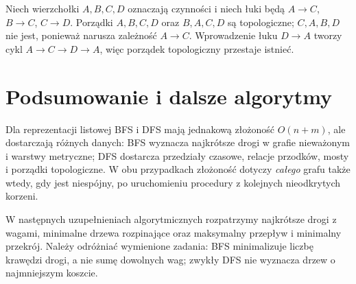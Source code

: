 \begin{przyklad}
Niech wierzchołki $A,B,C,D$ oznaczają
czynności i niech łuki będą
$A\to C$, $B\to C$, $C\to D$.
Porządki $A,B,C,D$ oraz $B,A,C,D$
są topologiczne; $C,A,B,D$ nie jest,
ponieważ narusza zależność $A\to C$.
Wprowadzenie łuku $D\to A$
tworzy cykl $A\to C\to D\to A$,
więc porządek topologiczny przestaje istnieć.
\end{przyklad}

\section{Podsumowanie i dalsze algorytmy}
\label{sec:tg-algo-summary}

Dla reprezentacji listowej BFS i DFS mają jednakową
złożoność $O(n+m)$, ale dostarczają różnych danych:
BFS wyznacza najkrótsze drogi w grafie nieważonym
i warstwy metryczne; DFS dostarcza przedziały
czasowe, relacje przodków, mosty i porządki
topologiczne. W obu przypadkach złożoność
dotyczy \emph{całego} grafu także wtedy, gdy
jest niespójny, po uruchomieniu procedury
z kolejnych nieodkrytych korzeni.

W następnych uzupełnieniach algorytmicznych
rozpatrzymy najkrótsze drogi z wagami,
minimalne drzewa rozpinające oraz
maksymalny przepływ i minimalny przekrój.
Należy odróżniać wymienione zadania:
BFS minimalizuje liczbę krawędzi drogi,
a nie sumę dowolnych wag; zwykły DFS
nie wyznacza drzew o najmniejszym koszcie.
